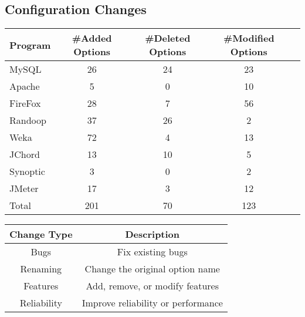 \subsection{Configuration Changes}

\begin{table}[t]
\vspace{1mm}
\centering
\small{
\setlength{\tabcolsep}{.50\tabcolsep}
\begin{tabular}{|l||c|c|c|c|}
\hline
 Program & \#Added Options & \#Deleted Options& \#Modified Options\\
 \hline
 \hline
 MySQL& 26 & 24 & 23 \\
 Apache & 5 & 0 & 10 \\
 FireFox& 28 & 7 & 56 \\
 Randoop & 37  & 26 & 2\\
 Weka &  72 & 4 & 13 \\
 JChord & 13  & 10 & 5 \\
 Synoptic & 3 & 0 & 2 \\
 JMeter & 17  & 3 &  12 \\
\hline
\hline
 Total & 201 & 70 & 123 \\
\hline
\end{tabular}
}
\vspace{-2mm}
\end{table}


\begin{table}[t]
\vspace{1mm}
\centering
\small{
\setlength{\tabcolsep}{.50\tabcolsep}
\begin{tabular}{|c|c|}
\hline
 \textbf{Change Type} & \textbf{Description} \\
 \hline
 \hline
Bugs & Fix existing bugs\\
 \hline
Renaming & Change the original option name\\
 \hline
Features & Add, remove, or modify features\\
 \hline
Reliability & Improve reliability or performance\\
\hline
\end{tabular}
}
\vspace{-2mm}
\end{table}



